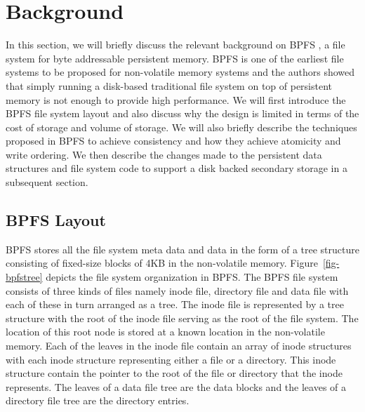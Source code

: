 \section{Background}
\label{sec-bg}
In this section, we will briefly discuss the relevant background on BPFS \cite{c10}, a file system for byte addressable persistent memory. BPFS is one of the earliest file systems to be proposed for non-volatile memory systems and the authors showed that simply running a disk-based traditional file system on top of persistent memory is not enough to provide high performance. We will first introduce the BPFS file system layout and also discuss why the design is limited in terms of the cost of storage and volume of storage. We will also briefly describe the techniques proposed in BPFS to achieve consistency and how they achieve atomicity and write ordering. We then describe the changes made to the persistent data structures and file system code to support a disk backed secondary storage in a subsequent section.

\subsection{BPFS Layout}
BPFS stores all the file system meta data and data in the form of a tree structure consisting of fixed-size blocks of 4KB in the non-volatile memory. Figure~\ref{fig-bpfstree} depicts the file system organization in BPFS. The BPFS file system consists of three kinds of files namely inode file, directory file and data file with each of these in turn arranged as a tree. The inode file is represented by a tree structure with the root of the inode file serving as the root of the file system. The location of this root node is stored at a known location in the non-volatile memory. Each of the leaves in the inode file contain an array of inode structures with each inode structure representing either a file or a directory. This inode structure contain the pointer to the root of the file or directory that the inode represents. The leaves of a data file tree are the data blocks and the leaves of a directory file tree are the directory entries.

